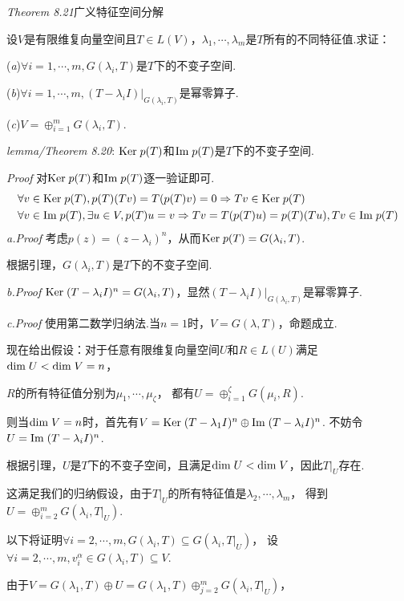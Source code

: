 \textit{Theorem 8.21}{\kaishu 广义特征空间分解}

设\(V\)是有限维复向量空间且\(T \in L(V)\)，\(\lambda_1,\cdots,\lambda_m\)是\(T\)所有的不同特征值.求证：

(\textit{a})\(\forall i=1,\cdots,m,G(\lambda_i,T)\)是\(T\)下的不变子空间.

(\textit{b})\(\forall i=1,\cdots,m,(T-\lambda_i I)|_{G(\lambda_i,T)}\)是幂零算子.

(\textit{c})\(V=\oplus_{i=1}^m G(\lambda_i,T)\).

\textit{lemma/Theorem 8.20}:
\(\mathrm{Ker \;} p(T)\)和\(\mathrm{Im \;} p(T)\)是\(T\)下的不变子空间.

\textit{Proof}
    对\(\mathrm{Ker \;} p(T)\)和\(\mathrm{Im \;} p(T)\)逐一验证即可.
    \begin{align*}
        &\forall v \in \mathrm{Ker \;} p(T),p(T)(Tv)=T(p(T)v)=0 \Rightarrow Tv \in \mathrm{Ker \;} p(T) \\
        &\forall v \in \mathrm{Im \;} p(T),\exists u \in V,p(T)u=v \Rightarrow Tv=T(p(T)u)=p(T)(Tu),Tv \in \mathrm{Im \;} p(T)
    \end{align*}
\textit{a.Proof}
考虑\(p(z)=(z-\lambda_i)^n\)，从而\(\mathrm{Ker \;} p(T)=G(\lambda_i,T)\).

根据引理，\(G(\lambda_i,T)\)是\(T\)下的不变子空间.

\textit{b.Proof}
\(\mathrm{Ker \;} (T-\lambda_i I)^n=G(\lambda_i,T)\)，显然\((T-\lambda_i I)|_{G(\lambda_i,T)}\)是幂零算子.

\textit{c.Proof}
使用第二数学归纳法.当\(n=1\)时，\(V=G(\lambda,T)\)，命题成立.

现在给出假设：对于任意有限维复向量空间\(U\)和\(R \in L(U)\)满足\(\mathrm{dim \;} U<\mathrm{dim \;} V=n\)，

\(R\)的所有特征值分别为\(\mu_1,\cdots,\mu_\zeta\)，
都有\(U=\oplus_{i=1}^\zeta G(\mu_i,R)\).

则当\(\mathrm{dim \;} V=n\)时，首先有\(V=\mathrm{Ker \;} (T-\lambda_1 I)^n \oplus \mathrm{Im \;} (T-\lambda_i I)^n\).
不妨令\(U=\mathrm{Im \;} (T-\lambda_i I)^n\).

根据引理，\(U\)是\(T\)下的不变子空间，且满足\(\mathrm{dim \;} U<\mathrm{dim \;} V\)，因此\(T|_U\)存在.

这满足我们的归纳假设，由于\(T|_U\)的所有特征值是\(\lambda_2,\cdots,\lambda_m\)，
得到\(U=\oplus_{i=2}^m G(\lambda_i,T|_U)\).

以下将证明\(\forall i=2,\cdots,m,G(\lambda_i,T) \subseteq G(\lambda_i,T|_U)\)，
设\(\forall i=2,\cdots,m,v_i^\alpha \in G(\lambda_i,T) \subseteq V\).

由于\(V=G(\lambda_1,T) \oplus U=G(\lambda_1,T) \oplus_{j=2}^m G(\lambda_i,T|_U)\)，

